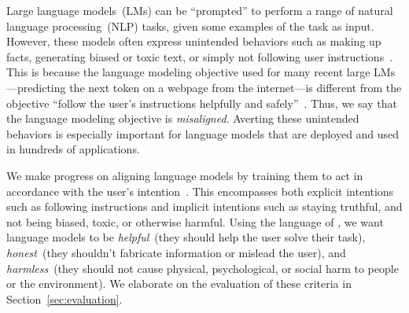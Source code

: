 Large language models~(LMs) can be ``prompted'' to perform a range of natural language processing~(NLP) tasks, given some examples of the task as input. However, these models often express unintended behaviors such as making up facts, generating biased or toxic text, or simply not following user instructions~\citep{bender2021dangers,bommasani2021opportunities,kenton2021alignment,weidinger2021ethical,tamkin2021understanding,gehman2020realtoxicityprompts}. This is because the language modeling objective used for many recent large LMs---predicting the next token on a webpage from the internet---is different from the objective ``follow the user's instructions helpfully and safely''~\citep{radford2019language,brown2020language,fedus2021switch,rae2021scaling,thoppilan2022lamda}. Thus, we say that the language modeling objective is \textit{misaligned}. Averting these unintended behaviors is especially important for language models that are deployed and used in hundreds of applications.

We make progress on aligning language models by training them to act in accordance with the user's intention~\citep{leike2018scalable}. This encompasses both explicit intentions such as following instructions and implicit intentions such as staying truthful, and not being biased, toxic, or otherwise harmful. Using the language of \citet{askell2021general}, we want language models to be \textit{helpful}~(they should help the user solve their task), \textit{honest}~(they shouldn't fabricate information or mislead the user), and \textit{harmless}~(they should not cause physical, psychological, or social harm to people or the environment). We elaborate on the evaluation of these criteria in Section~\ref{sec:evaluation}.


